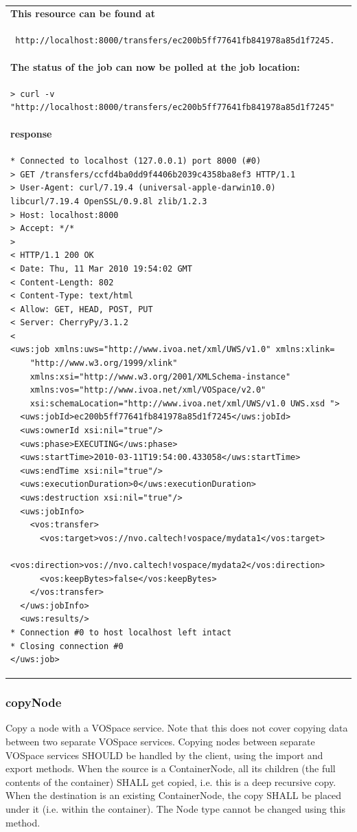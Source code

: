 \documentclass[11pt,a4paper]{ivoa}
\begin{document}
\paragraph{}
\begin{tabular}{ p{10cm} }
\\
\textbf{This resource can be found at} \\
\begin{lstlisting}
 http://localhost:8000/transfers/ec200b5ff77641fb841978a85d1f7245. 
\end{lstlisting} \\
\textbf{The status of the job can now be polled at the job location:} \\
\begin{lstlisting}
> curl -v "http://localhost:8000/transfers/ec200b5ff77641fb841978a85d1f7245"
\end{lstlisting} \\
\textbf{response} \\
\begin{lstlisting}
* Connected to localhost (127.0.0.1) port 8000 (#0)
> GET /transfers/ccfd4ba0dd9f4406b2039c4358ba8ef3 HTTP/1.1
> User-Agent: curl/7.19.4 (universal-apple-darwin10.0) libcurl/7.19.4 OpenSSL/0.9.8l zlib/1.2.3
> Host: localhost:8000
> Accept: */*
> 
< HTTP/1.1 200 OK
< Date: Thu, 11 Mar 2010 19:54:02 GMT
< Content-Length: 802
< Content-Type: text/html
< Allow: GET, HEAD, POST, PUT
< Server: CherryPy/3.1.2
< 
<uws:job xmlns:uws="http://www.ivoa.net/xml/UWS/v1.0" xmlns:xlink=
    "http://www.w3.org/1999/xlink"
    xmlns:xsi="http://www.w3.org/2001/XMLSchema-instance"
    xmlns:vos="http://www.ivoa.net/xml/VOSpace/v2.0"
    xsi:schemaLocation="http://www.ivoa.net/xml/UWS/v1.0 UWS.xsd ">
  <uws:jobId>ec200b5ff77641fb841978a85d1f7245</uws:jobId>
  <uws:ownerId xsi:nil="true"/>
  <uws:phase>EXECUTING</uws:phase>
  <uws:startTime>2010-03-11T19:54:00.433058</uws:startTime>
  <uws:endTime xsi:nil="true"/>
  <uws:executionDuration>0</uws:executionDuration>
  <uws:destruction xsi:nil="true"/>
  <uws:jobInfo>
    <vos:transfer>
      <vos:target>vos://nvo.caltech!vospace/mydata1</vos:target>
      <vos:direction>vos://nvo.caltech!vospace/mydata2</vos:direction>
      <vos:keepBytes>false</vos:keepBytes>
    </vos:transfer>
  </uws:jobInfo>
  <uws:results/>
* Connection #0 to host localhost left intact
* Closing connection #0
</uws:job>
\end{lstlisting}
\end{tabular}

\subsubsection{copyNode}
Copy a node with a VOSpace service.
Note that this does not cover copying data between two separate VOSpace services.
Copying nodes between separate VOSpace services SHOULD be handled by the client, using the import and export methods.
When the source is a ContainerNode, all its children (the full contents of the container) SHALL get copied, i.e. this is a deep recursive copy.
When the destination is an existing ContainerNode, the copy SHALL be placed under it (i.e. within the container).
The Node type cannot be changed using this method.
\end{document}
